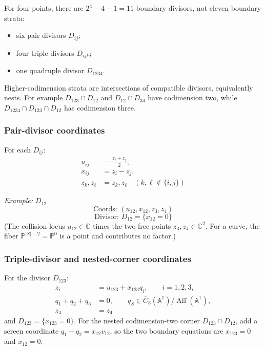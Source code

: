 \begin{example}\label{ex:coords-n4-complete}
For four points, there are $2^4-4-1=11$ boundary divisors, not eleven
boundary strata:
\begin{itemize}
\item six pair divisors $D_{ij}$;
\item four triple divisors $D_{ijk}$;
\item one quadruple divisor $D_{1234}$.
\end{itemize}
Higher-codimension strata are intersections of compatible divisors,
equivalently nests. For example $D_{123}\cap D_{12}$ and
$D_{12}\cap D_{34}$ have codimension two, while
$D_{1234}\cap D_{123}\cap D_{12}$ has codimension three.

\subsubsection{Pair-divisor coordinates}

For each $D_{ij}$:
\begin{align}
u_{ij} &= \frac{z_i + z_j}{2},\\
x_{ij} &= z_i-z_j,\\
z_k, z_\ell &= z_k, z_\ell \quad (k, \ell \notin \{i,j\})
\end{align}

\emph{Example: $D_{12}$.}
\[\text{Coords: } (u_{12},x_{12},z_3,z_4)\]
\[\text{Divisor: } D_{12}=\{x_{12}=0\}\]
(The collision locus $u_{12} \in \mathbb{C}$ times the two free points $z_3, z_4 \in \mathbb{C}^2$. For a curve, the fiber $\mathbb{P}^{|S|-2} = \mathbb{P}^0$ is a point and contributes no factor.)

\subsubsection{Triple-divisor and nested-corner coordinates}

For the divisor $D_{123}$:
\begin{align}
z_i&=u_{123}+x_{123}q_i,\qquad i=1,2,3,\\
q_1+q_2+q_3&=0,\qquad q_S\in
\overline C_3(\mathbb{A}^1)/\operatorname{Aff}(\mathbb{A}^1),\\
z_4 &= z_4
\end{align}
and $D_{123}=\{x_{123}=0\}$. For the nested codimension-two corner
$D_{123}\cap D_{12}$, add a screen coordinate
$q_1-q_2=x_{12}v_{12}$, so the two boundary equations are
$x_{123}=0$ and $x_{12}=0$.


\end{example}
